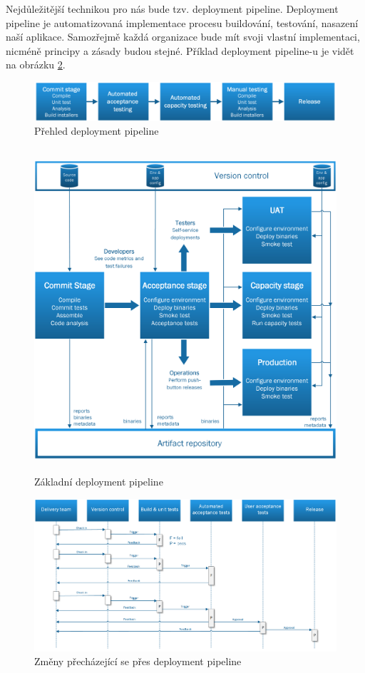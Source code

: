 Nejdůležitější technikou pro nás bude tzv. deployment pipeline. Deployment pipeline je automatizovaná implementace procesu buildování, testování, nasazení naší aplikace. Samozřejmě každá organizace bude mít svoji vlastní implementaci, nicméně principy a zásady budou stejné. Příklad deployment pipeline-u je vidět na obrázku \ref{fig:pipeline}.

\begin{figure}[]
  \centering
  \includegraphics[width=15cm]{fig/pipeline_overview.png}
  \caption{Přehled deployment pipeline}
  \label{fig:pipeline_overview}
\end{figure}

\begin{figure}[]
  \centering
  \includegraphics[height=12cm]{fig/pipeline_basic.png}
  \caption{Základní deployment pipeline}
  \label{fig:pipeline}
\end{figure}

\begin{figure}[]
  \centering
  \includegraphics[width=15cm]{fig/pipeline_changes.png}
  \caption{Změny přecházející se přes deployment pipeline}
  \label{fig:pipeline_overview}
\end{figure}

